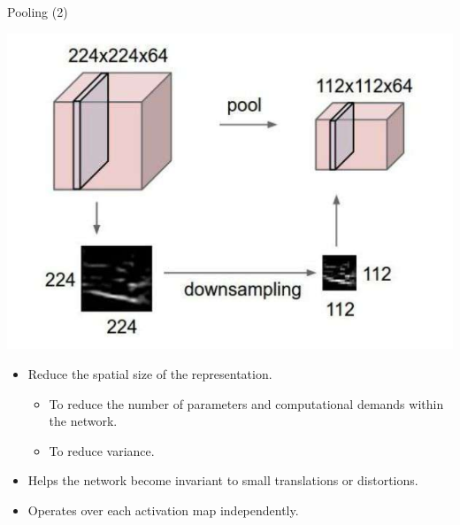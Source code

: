 \documentclass[default, aspectratio=169]{beamer}
\begin{document}
	\begin{frame}{Pooling (2)}
		\begin{minipage}{0.4\textwidth}
			\centering
			\includegraphics[keepaspectratio, scale=0.4]{pic/pooling1.png}
		\end{minipage}%
		\hspace{0.5cm}  %
		\begin{minipage}{0.55\textwidth}
			\smallskip
			\begin{itemize}
				\item Reduce the spatial size of the representation.
				\begin{itemize}
					\item To reduce the number of parameters and computational demands within the network.
					\item To reduce variance.
				\end{itemize}
				\item Helps the network become invariant to small translations or distortions.
				\item Operates over each activation map independently.
			\end{itemize}
		\end{minipage}
	\end{frame}
\end{document}
